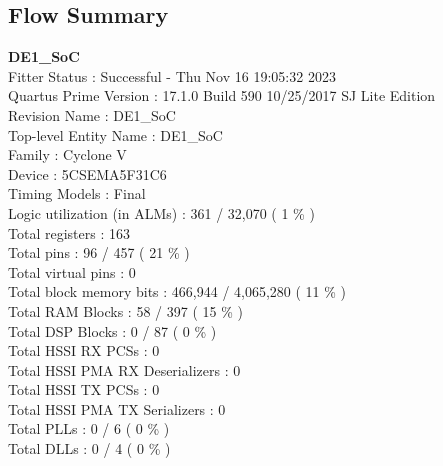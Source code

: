 \documentclass[11pt, titlepage]{article}
\begin{document}
        \newpage
        \subsection{Flow Summary}
            \begin{description}
                \item \textbf{DE1\_SoC} \\
                    Fitter Status : Successful - Thu Nov 16 19:05:32 2023 \\
                    Quartus Prime Version : 17.1.0 Build 590 10/25/2017 SJ  Lite Edition \\
                    Revision Name : DE1\_SoC \\
                    Top-level Entity Name : DE1\_SoC \\
                    Family : Cyclone V \\
                    Device : 5CSEMA5F31C6 \\
                    Timing Models : Final \\
                    Logic utilization (in ALMs) : 361 / 32,070 ( 1 \% ) \\
                    Total registers : 163 \\
                    Total pins : 96 / 457 ( 21 \% ) \\
                    Total virtual pins : 0 \\
                    Total block memory bits : 466,944 / 4,065,280 ( 11 \% ) \\
                    Total RAM Blocks : 58 / 397 ( 15 \% ) \\
                    Total DSP Blocks : 0 / 87 ( 0 \% ) \\
                    Total HSSI RX PCSs : 0 \\
                    Total HSSI PMA RX Deserializers : 0 \\
                    Total HSSI TX PCSs : 0 \\
                    Total HSSI PMA TX Serializers : 0 \\
                    Total PLLs : 0 / 6 ( 0 \% ) \\
                    Total DLLs : 0 / 4 ( 0 \% ) \\


\end{description}
\end{document}

